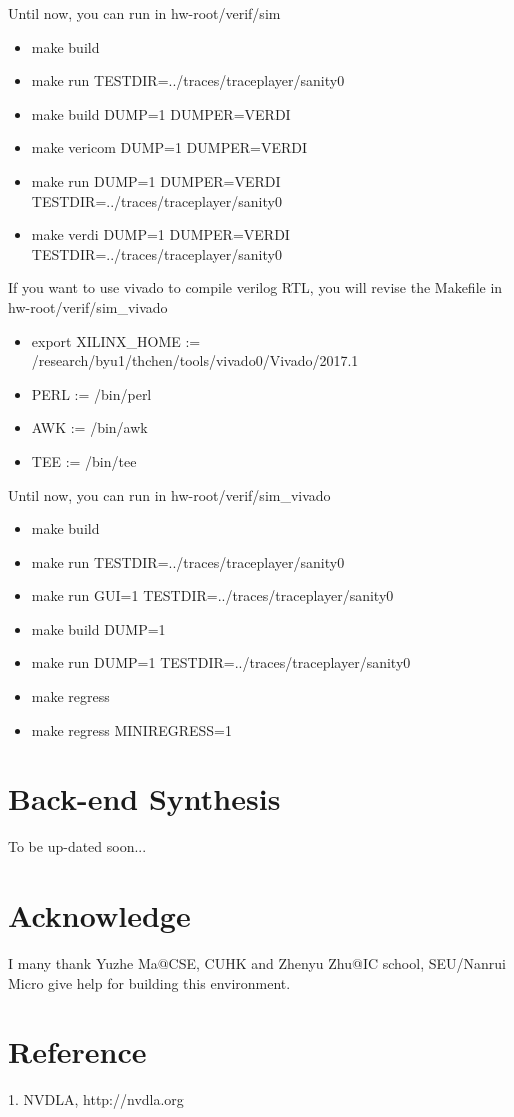 Until now, you can run in hw-root/verif/sim
\begin{itemize}
    \item make build
    \item make run TESTDIR=../traces/traceplayer/sanity0
    \item make build DUMP=1 DUMPER=VERDI
    \item make vericom DUMP=1 DUMPER=VERDI
    \item make run DUMP=1 DUMPER=VERDI TESTDIR=../traces/traceplayer/sanity0
    \item make verdi DUMP=1 DUMPER=VERDI TESTDIR=../traces/traceplayer/sanity0
\end{itemize}


If you want to use vivado to compile verilog RTL, you will revise the Makefile in hw-root/verif/sim\_vivado
\begin{itemize}
    \item export XILINX\_HOME := /research/byu1/thchen/tools/vivado0/Vivado/2017.1
    \item PERL := /bin/perl
    \item AWK := /bin/awk
    \item TEE := /bin/tee
\end{itemize}
Until now, you can run in hw-root/verif/sim\_vivado
\begin{itemize}
    \item make build
    \item make run TESTDIR=../traces/traceplayer/sanity0
    \item make run GUI=1 TESTDIR=../traces/traceplayer/sanity0
    \item make build DUMP=1
    \item make run DUMP=1 TESTDIR=../traces/traceplayer/sanity0
    \item make regress
    \item make regress MINIREGRESS=1
\end{itemize}

\section{Back-end Synthesis}
To be up-dated soon...



\section*{Acknowledge}
I many thank Yuzhe Ma@CSE, CUHK and Zhenyu Zhu@IC school, SEU/Nanrui Micro give help for building this environment. 

\section{Reference}
1. NVDLA, http://nvdla.org